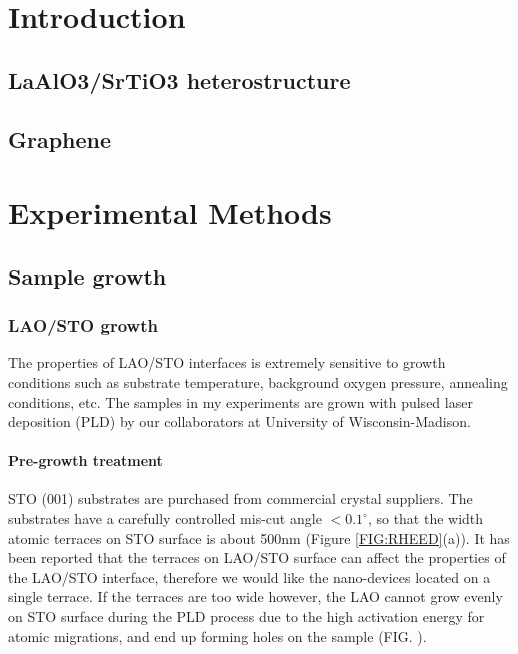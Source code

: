 \documentclass[pdftex, sectionletters]{pittetd}    %
\begin{document}
\chapter{Introduction}%

\section{LaAlO3/SrTiO3 heterostructure}

\section{Graphene}



\chapter{Experimental Methods}

\section{Sample growth}

\subsection{LAO/STO growth}
The properties of LAO/STO interfaces is extremely sensitive to growth conditions such as substrate temperature, background oxygen pressure, annealing conditions, etc\cite{}. The samples in my experiments are grown with pulsed laser deposition (PLD) by our collaborators at University of Wisconsin-Madison.

\subsubsection{Pre-growth treatment}

STO (001) substrates are purchased from commercial crystal suppliers. The substrates have a carefully controlled mis-cut angle $< 0.1^{\circ}$, so that the width atomic terraces on STO surface is about 500nm (Figure \ref{FIG:RHEED}(a)). It has been reported that the terraces on LAO/STO surface can affect the properties of the LAO/STO interface\cite{}, therefore we would like the nano-devices located on a single terrace. If the terraces are too wide however, the LAO cannot grow evenly on STO surface during the PLD process due to the high activation energy for atomic migrations, and end up forming holes on the sample (FIG. \cite{}). 
\end{document}
